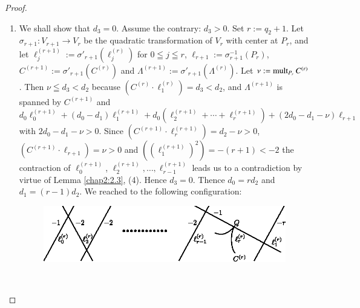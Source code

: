 \begin{proof}
\begin{enumerate}
\item We shall show that $d_{3}=0$. Assume the contrary:
  $d_{3}>0$. Set $r:=q_{2}+1$. Let $\sigma_{r+1}:V_{r+1}\to V_{r}$ be
  the quadratic transformation of $V_{r}$ with center at $P_{r}$, and
  let $\ell^{(r+1)}_{j}:=\sigma'_{r+1}(\ell^{(r)}_{j})$ for $0\leqq
  j\leqq r$, $\ell_{r+1}:=\sigma^{-1}_{r+1}(P_{r})$,
  $C^{(r+1)}:=\sigma'_{r+1}(C^{(r)})$ and
  $\Lambda^{(r+1)}:=\sigma'_{r+1}(\Lambda^{(r)})$. Let
  $\nu:=\operatorname{mult}_{P_{r}}C^{(r)}$. Then $\nu\leqq d_{3}<d_{2}$ because
  $(C^{(r)}\cdot \ell^{(r)}_{1})=d_{3}<d_{2}$, and $\Lambda^{(r+1)}$
  is spanned by $C^{(r+1)}$ and
  $d_{0}\ell_{0}^{(r+1)}+(d_{0}-d_{1})\ell^{(r+1)}_{1}+d_{0}(\ell_{2}^{(r+1)}+\cdots+\ell_{r}^{(r+1)})+(2d_{0}-d_{1}-\nu)\ell_{r+1}$
  with $2d_{0}-d_{1}-\nu>0$. Since $(C^{(r+1)}\cdot
  \ell^{(r+1)}_{r})=d_{2}-\nu>0$, $(C^{(r+1)}\cdot\ell_{r+1})=\nu>0$
  and $((\ell_{1}^{(r+1)})^{2})=-(r+1)<-2$ the contraction of
  $\ell_{0}^{(r+1)}$, $\ell^{(r+1)}_{2},\ldots,\ell^{(r+1)}_{r-1}$
  leads us to a contradiction by virtue of Lemma \ref{chap2:2.3},
  (4). Hence $d_{3}=0$. Thence $d_{0}=rd_{2}$ and
  $d_{1}=(r-1)d_{2}$. We reached to the following configuration:
\begin{figure}[H]
\centering
\includegraphics[scale=1.1]{figures/chap2-fig22.eps}
\end{figure}\pageoriginale\



\end{enumerate}
\end{proof}
